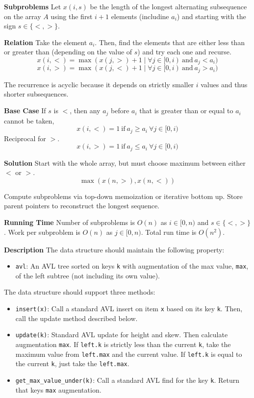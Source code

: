 \documentclass[12pt,twoside]{article}
\begin{document}
\begin{problems}
\begin{problemparts}
\end{problemparts}

\newpage
\problem  %

\begin{problemparts}
\problempart %

{\bf Subproblems} Let $x(i, s)$ be the length of the longest alternating
subsequence on the array $A$ using the first $i + 1$ elements (includine
$a_i$) and starting with the sign $s \in \{<, >\}$.

{\bf Relation} Take the element $a_i$. Then, find the elements that are
either less than or greater than (depending on the value of $s$) and try each
one and recurse.
$$ x(i, <) = \max(x(j, >) + 1 \mid \forall j \in [0, i)\ \mathrm{and}\ a_j <
a_i) $$
$$ x(i, >) = \max(x(j, <) + 1 \mid \forall j \in [0, i)\ \mathrm{and}\ a_j >
a_i) $$

The recurrence is acyclic because it depends on strictly smaller $i$ values
and thus shorter subsequences.

{\bf Base Case} If $s$ is $<$, then any $a_j$ before $a_i$ that is greater
than or equal to $a_i$ cannot be taken,
$$ x(i, <) = 1\ \mathrm{if}\ a_j \geq a_i\ \forall j \in [0, i) $$
Reciprocal for $>$.
$$ x(i, >) = 1\ \mathrm{if}\ a_j \leq a_i\ \forall j \in [0, i) $$

{\bf Solution} Start with the whole array, but must choose maximum between
either $<$ or $>$.
$$ \max(x(n, >), x(n, <)) $$

Compute subproblems via top-down memoization or iterative bottom up. Store
parent pointers to reconstruct the longest sequence.

{\bf Running Time} Number of subproblems is $O(n)$ as $i \in [0, n)$ and $s
\in \{<, >\}$. Work per subproblem is $O(n)$ as $j \in [0, n)$. Total run
time is $O(n^2)$.

\problempart %

{\bf Description} The data structure should maintain the following property:
\begin{itemize}
  \item {\tt avl}: An AVL tree sorted on keys {\tt k} with augmentation of the
  max value, {\tt max}, of the left subtree (not including its own value).
\end{itemize}

The data structure should support three methods:
\begin{itemize}
  \item {\tt insert(x)}: Call a standard AVL insert on item {\tt x} based on its
  key {\tt k}. Then, call the update method described below.
  \item {\tt update(k)}: Standard AVL update for height and skew. Then
  calculate augmentation {\tt max}. If {\tt left.k} is strictly
  less than the current {\tt k}, take the maximum value from {\tt left.max}
  and the current value. If {\tt left.k} is equal to the current {\tt k},
  just take the {\tt left.max}.
  \item {\tt get\_max\_value\_under(k)}: Call a standard AVL find for the key
  {\tt k}. Return that keys {\tt max} augmentation.
\end{itemize}


\end{problemparts}
\end{problems}
\end{document}
